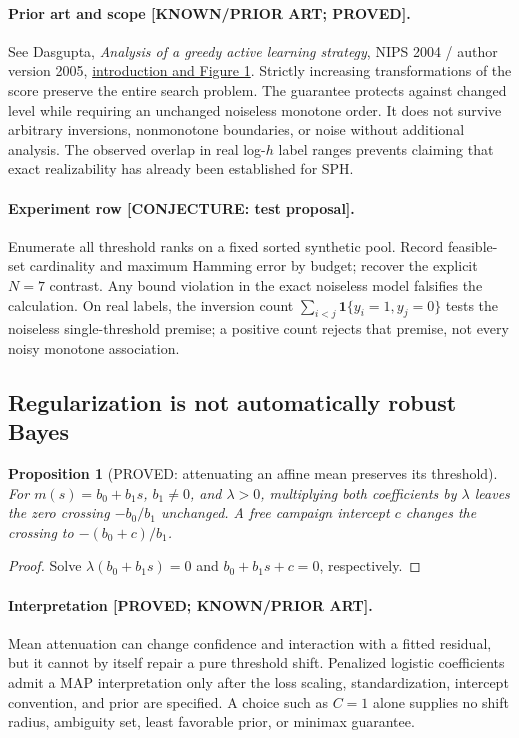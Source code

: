 \documentclass[11pt]{article}
\newtheorem{proposition}[theorem]{Proposition}
\theoremstyle{definition}
\theoremstyle{remark}
\begin{document}
\paragraph{Prior art and scope [KNOWN/PRIOR ART; PROVED].}
See Dasgupta, \emph{Analysis of a greedy active learning strategy},
NIPS 2004 / author version 2005,
\href{https://cseweb.ucsd.edu/~dasgupta/papers/greedy.pdf}{introduction and Figure 1}.
Strictly increasing transformations of the score preserve the entire
search problem.  The guarantee protects against changed level while
requiring an unchanged noiseless monotone order.  It does not survive
arbitrary inversions, nonmonotone boundaries, or noise without additional
analysis.  The observed overlap in real log-$h$ label ranges prevents
claiming that exact realizability has already been established for SPH.

\paragraph{Experiment row [CONJECTURE: test proposal].}
Enumerate all threshold ranks on a fixed sorted synthetic pool.  Record
feasible-set cardinality and maximum Hamming error by budget; recover
the explicit $N=7$ contrast.  Any bound violation in the exact noiseless
model falsifies the calculation.  On real labels, the inversion count
$\sum_{i<j}\mathbf{1}\{y_i=1,y_j=0\}$ tests the noiseless single-threshold
premise; a positive count rejects that premise, not every noisy monotone
association.

\subsection{Regularization is not automatically robust Bayes}

\begin{proposition}[PROVED: attenuating an affine mean preserves its threshold]
For $m(s)=b_0+b_1s$, $b_1\ne0$, and $\lambda>0$, multiplying both
coefficients by $\lambda$ leaves the zero crossing $-b_0/b_1$ unchanged.
A free campaign intercept $c$ changes the crossing to
$-(b_0+c)/b_1$.
\end{proposition}
\begin{proof}
Solve $\lambda(b_0+b_1s)=0$ and $b_0+b_1s+c=0$, respectively.
\end{proof}

\paragraph{Interpretation [PROVED; KNOWN/PRIOR ART].}
Mean attenuation can change confidence and interaction with a fitted
residual, but it cannot by itself repair a pure threshold shift.
Penalized logistic coefficients admit a MAP interpretation only after
the loss scaling, standardization, intercept convention, and prior are
specified.  A choice such as $C=1$ alone supplies no shift radius,
ambiguity set, least favorable prior, or minimax guarantee.
\end{document}
